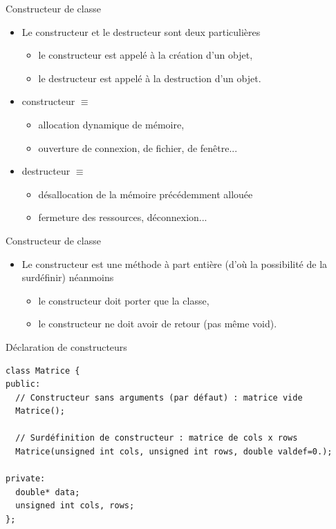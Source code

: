 \documentclass[c]{beamer}
\begin{document}
\begin{frame}[fragile]{Constructeur de classe}
\begin{itemize}
\item Le constructeur et le destructeur sont deux  particulières

\begin{itemize}
\item le constructeur est appelé à la création d'un objet,
\item le destructeur est appelé à la destruction d'un objet.
\end{itemize}

\item constructeur \(\equiv\) 
\begin{itemize}
\item allocation dynamique de mémoire,
\item ouverture de connexion, de fichier, de fenêtre...
\end{itemize}

\item destructeur \(\equiv\) 
\begin{itemize}
\item désallocation de la mémoire précédemment allouée
\item fermeture des ressources, déconnexion...
\end{itemize}

\end{itemize}
\end{frame}

\begin{frame}[fragile]{Constructeur de classe}
\begin{itemize}
\item Le constructeur est une méthode à part entière (d'où la possibilité de la
  surdéfinir) néanmoins
  
\begin{itemize}
\item le constructeur doit porter  que la classe,

\item le constructeur ne doit avoir  de retour (pas même void).
\end{itemize}
\end{itemize}
\end{frame}

\begin{frame}[fragile]{Déclaration de constructeurs}
\begin{verbatim}
class Matrice {
public:
  // Constructeur sans arguments (par défaut) : matrice vide
  Matrice();

  // Surdéfinition de constructeur : matrice de cols x rows
  Matrice(unsigned int cols, unsigned int rows, double valdef=0.);

private:
  double* data;
  unsigned int cols, rows;
};
\end{verbatim}
\end{frame}
\end{document}
